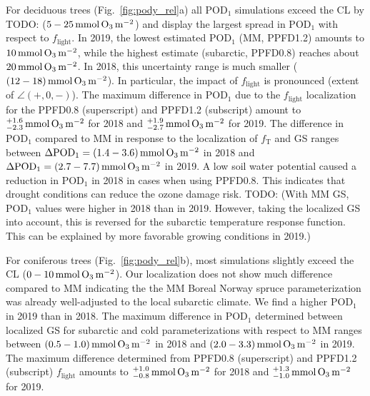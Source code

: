 \documentclass[bg, manuscript]{copernicus}
\begin{document}
For deciduous trees (Fig.~\ref{fig:pody_rel}a) all $\mathrm{POD_1}$ simulations exceed the CL by TODO: ($5-25\,\unit{mmol\,\chem{O_3}\,m^{-2}}$) and display the largest spread in $\mathrm{POD_1}$ with respect to $f_\mathrm{light}$. In 2019, the lowest estimated $\mathrm{POD_1}$ (MM, PPFD1.2) amounts to $10\,\unit{mmol\,\chem{O_3}\,m^{-2}}$, while the highest estimate (subarctic, PPFD0.8) reaches about $20\,\unit{mmol\,\chem{O_3}\,m^{-2}}$. In 2018, this uncertainty range is much smaller ($(12-18)\,\unit{mmol\,\chem{O_3}\,m^{-2}}$). In particular, the impact of $f_\mathrm{light}$ is pronounced (extent of $\angle(+,0,-)$). The maximum difference in $\mathrm{POD_1}$ due to the $f_\mathrm{light}$ localization for the PPFD0.8 (superscript) and PPFD1.2 (subscript) amount to $^{+1.6}_{-2.3}\,\unit{mmol\,\chem{O_3}\,m^{-2}}$ for 2018 and $^{+1.9}_{-2.7}\,\unit{mmol\,\chem{O_3}\,m^{-2}}$ for 2019. The difference in $\mathrm{POD_1}$ compared to MM in response to the localization of $f_\mathrm{T}$ and GS ranges between $\Delta\mathrm{POD_1}=(1.4-3.6)\,\unit{mmol\,\chem{O_3}\,m^{-2}}$ in 2018 and $\Delta\mathrm{POD_1}=(2.7-7.7)\,\unit{mmol\,\chem{O_3}\,m^{-2}}$ in 2019. A low soil water potential caused a reduction in $\mathrm{POD_1}$ in 2018 in cases when using PPFD0.8. This indicates that drought conditions can reduce the ozone damage risk. TODO: (With MM GS, $\mathrm{POD_1}$ values were higher in 2018 than in 2019. However, taking the localized GS into account, this is reversed for the subarctic temperature response function. This can be explained by more favorable growing conditions in 2019.) 

For coniferous trees (Fig.~\ref{fig:pody_rel}b), most simulations slightly exceed the CL ($0-10\,\unit{mmol\,\chem{O_3}\,m^{-2}}$). Our localization does not show much difference compared to MM indicating the the MM Boreal Norway spruce parameterization was already well-adjusted to the local subarctic climate. We find a higher $\mathrm{POD_1}$ in 2019 than in 2018. The maximum difference in $\mathrm{POD_1}$ determined between localized GS for subarctic and cold parameterizations with respect to MM ranges between $(0.5-1.0)\,\unit{mmol\,\chem{O_3}\,m^{-2}}$ in 2018 and $(2.0-3.3)\,\unit{mmol\,\chem{O_3}\,m^{-2}}$ in 2019. The maximum difference determined from PPFD0.8 (superscript) and PPFD1.2 (subscript) $f_\mathrm{light}$ amounts to $^{+1.0}_{-0.8}\,\unit{mmol\,\chem{O_3}\,m^{-2}}$ for 2018 and $^{+1.3}_{-1.0}\,\unit{mmol\,\chem{O_3}\,m^{-2}}$ for 2019.
\end{document}
